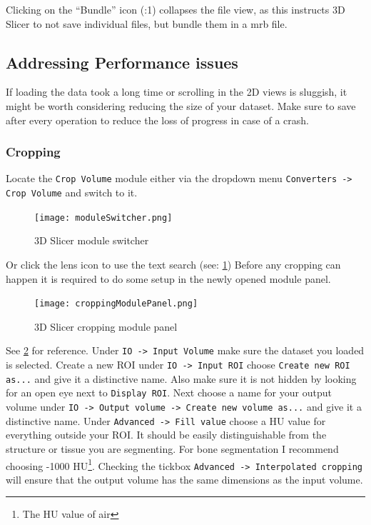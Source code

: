 Clicking on the ``Bundle'' icon (:1) collapses the file view, as this instructs 3D Slicer to not save individual files, but bundle them in a \Gls{mrb} file.

\pagebreak

\subsection{Addressing Performance issues}
If loading the data took a long time or scrolling in the 2D views is sluggish, %
it might be worth considering reducing the size of your dataset.
Make sure to save after every operation to reduce the loss of progress in case of a crash.

\subsubsection{Cropping} \label{crop}
Locate the \texttt{Crop Volume} module either via the dropdown menu
\texttt{Converters -> Crop Volume} and switch to it.
\begin{figure}[h!]
	\centerline{
		\texttt{[image: moduleSwitcher.png]}}
	  \caption{3D Slicer module switcher}
	  \label{fig:mS}
\end{figure}
Or click the lens icon to use the text search (see: \cref{fig:mS})
Before any cropping can happen it is required to do some setup in the newly opened module panel.
\begin{figure}[h!]
	\centerline{
		\texttt{[image: croppingModulePanel.png]}}
	  \caption{3D Slicer cropping module panel}
	  \label{fig:cMP}
\end{figure}
See \cref{fig:cMP} for reference.
Under \texttt{IO -> Input Volume} make sure the dataset you loaded is selected.
Create a new ROI under \texttt{IO -> Input ROI} choose \texttt{Create new ROI as...} and give it a distinctive name. Also make sure it is not hidden by looking for an open eye next to \texttt{Display ROI}.
Next choose a name for your output volume under \texttt{IO -> Output volume -> Create new volume as...} and give it a distinctive name.
Under \texttt{Advanced -> Fill value} choose a HU value for everything outside your ROI. It should be easily distinguishable from the structure or tissue you are segmenting. For bone segmentation I recommend choosing -1000 HU\footnote{The HU value of air}. Checking the tickbox \texttt{Advanced -> Interpolated cropping} will ensure that the output volume has the same dimensions as the input volume.
